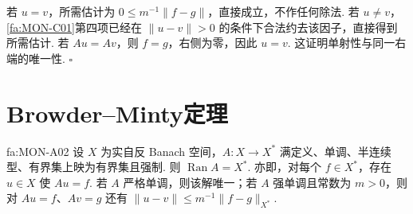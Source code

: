 \begin{FAProof}
若 \(\displaystyle u=v\)，所需估计为 \(\displaystyle0\leqslant m^{-1}\|f-g\|\)，直接成立，不作任何除法. 若 \(\displaystyle u\neq v\)，\autoref{fa:MON-C01}第四项已经在 \(\displaystyle\|u-v\|>0\) 的条件下合法约去该因子，直接得到所需估计.
若 \(\displaystyle Au=Av\)，则 \(\displaystyle f=g\)，右侧为零，因此 \(\displaystyle u=v\). 这证明单射性与同一右端的唯一性.
\hfill\(\square\)
\end{FAProof}

\section{Browder--Minty定理}\label{sec:iii05-browder-minty}

\begin{FATheorem}{fa:MON-A02}
设 \(\displaystyle X\) 为实自反 Banach 空间，\(\displaystyle A:X\to X^*\) 满定义、单调、半连续型、有界集上映为有界集且强制. 则
\(\displaystyle \operatorname{Ran}A=X^*.\)
亦即，对每个 \(\displaystyle f\in X^*\)，存在 \(\displaystyle u\in X\) 使 \(\displaystyle Au=f\). 若 \(\displaystyle A\) 严格单调，则该解唯一；若 \(\displaystyle A\) 强单调且常数为 \(\displaystyle m>0\)，则对 \(\displaystyle Au=f\)、\(\displaystyle Av=g\) 还有
\(\displaystyle \|u-v\| \leqslant m^{-1}\|f-g\|_{X^*}.\)
\end{FATheorem}

